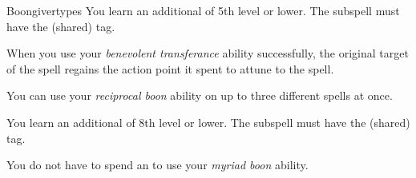 \begin{feat}{Boongiver}{types}
         You learn an additional  of 5th level or lower.
        The subspell must have the  (shared) tag.

         When you use your \textit{benevolent transferance} ability successfully, the original target of the spell regains the action point it spent to attune to the spell.

         You can use your \textit{reciprocal boon} ability on up to three different spells at once.

         You learn an additional  of 8th level or lower.
        The subspell must have the  (shared) tag.

         You do not have to spend an  to use your \textit{myriad boon} ability.

    \end{feat}


